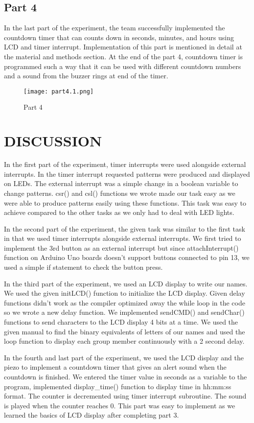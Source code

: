 \documentclass[pdftex,12pt,a4paper]{article}
\begin{document}
\subsection{Part 4}
In the last part of the experiment, the team successfully implemented the countdown timer that can counts down in seconds, minutes, and hours using LCD and timer interrupt. Implementation of this part is mentioned in detail at the material and methods section. At the end of the part 4, countdown timer is programmed such a way that it can be used with different countdown numbers and a sound from the buzzer rings at end of the timer.
\begin{figure}[H]
	\centering
	\texttt{[image: part4.1.png]}
	\caption{Part 4}
\end{figure}
\section{DISCUSSION}
In the first part of the experiment, timer interrupts were used alongside external interrupts. In the timer interrupt requested patterns were produced and displayed on LEDs. The external interrupt was a simple change in a boolean variable to change patterns. csr() and csl() functions we wrote made our task easy as we were able to produce patterns easily using these functions. This task was easy to achieve compared to the other tasks as we only had to deal with LED lights.

In the second part of the experiment, the given task was similar to the first task in that we used timer interrupts alongside external interrupts. We first tried to implement the 3rd button as an external interrupt but since attachInterrupt() function on Arduino Uno boards doesn't support buttons connected to pin 13, we used a simple if statement to check the button press.

In the third part of the experiment, we used an LCD display to write our names. We used the given initLCD() function to initialize the LCD display. Given delay functions didn't work as the compiler optimized away the while loop in the code so we wrote a new delay function. We implemented sendCMD() and sendChar() functions to send characters to the LCD display 4 bits at a time. We used the given manual to find the binary equivalents of letters of our names and used the loop function to display each group member continuously with a 2 second delay.

In the fourth and last part of the experiment, we used the LCD display and the piezo to implement a countdown timer that gives an alert sound when the countdown is finished. We entered the timer value in seconds as a variable to the program, implemented display\_time() function to display time in hh:mm:ss format. The counter is decremented using timer interrupt subroutine. The sound is played when the counter reaches 0. This part was easy to implement as we learned the basics of LCD display after completing part 3.
\end{document}
